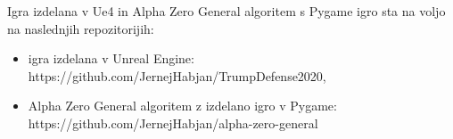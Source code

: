 \documentclass[a4paper, 12pt]{book}
\begin{document}
Igra izdelana v Ue4 in Alpha Zero General algoritem s Pygame igro sta na voljo na naslednjih repozitorijih:
\begin{itemize}
	\item igra izdelana v Unreal Engine: \\https://github.com/JernejHabjan/TrumpDefense2020,
	\item Alpha Zero General algoritem z izdelano igro v Pygame: \\https://github.com/JernejHabjan/alpha-zero-general
	
\end{itemize}


\newpage %
\ \\
\clearpage
{}


\end{document}
